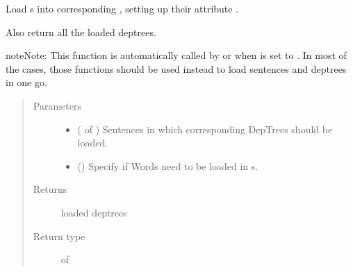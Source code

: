\documentclass[letterpaper,10pt,english]{sphinxmanual}
\begin{document}
\begin{fulllineitems}
\label{\detokenize{index:loacore.load.deptree_load.load_dep_tree_in_sentences}}
Load  s into corresponding , setting up their attribute .

Also return all the loaded deptrees.

\begin{sphinxadmonition}{note}{Note:}
This function is automatically called by  or
 when  is set to .
In most of the cases, those functions should be used instead to load sentences and deptrees in one go.
\end{sphinxadmonition}
\begin{quote}\begin{description}
\item[{Parameters}] \leavevmode\begin{itemize}
\item {} 
 ( of ) \textendash{} Sentences in which corresponding DepTrees should be loaded.

\item {} 
 () \textendash{} Specify if Words need to be loaded in  s.

\end{itemize}

\item[{Returns}] \leavevmode
loaded deptrees

\item[{Return type}] \leavevmode
{} of 

\end{description}\end{quote}

\end{fulllineitems}
\end{document}
